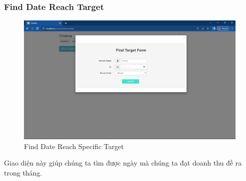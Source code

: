 \subsubsection{Find Date Reach Target}
\begin{figure}[H]
    \centering
    \includegraphics[scale=0.45]{images/findDateReachTarget.png}
    \caption{Find Date Reach Specific Target}
\end{figure}

Giao diện này giúp chúng ta tìm được ngày mà chúng ta đạt doanh thu đề ra trong tháng.

